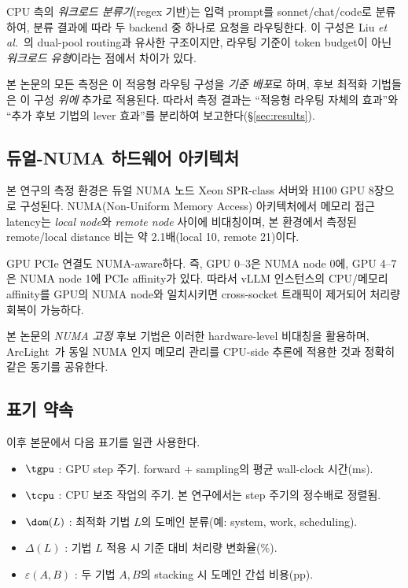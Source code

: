CPU 측의 \emph{워크로드 분류기}(regex 기반)는 입력 prompt를 sonnet/chat/code로 분류하여, 분류 결과에 따라 두 backend 중 하나로 요청을 라우팅한다.
이 구성은 Liu \emph{et al.}~\cite{liu2026dualpool}의 dual-pool routing과 유사한 구조이지만, 라우팅 기준이 token budget이 아닌 \emph{워크로드 유형}이라는 점에서 차이가 있다.

본 논문의 모든 측정은 이 적응형 라우팅 구성을 \emph{기준 배포}로 하며, 후보 최적화 기법들은 이 구성 \emph{위에} 추가로 적용된다.
따라서 측정 결과는 ``적응형 라우팅 자체의 효과''와 ``추가 후보 기법의 lever 효과''를 분리하여 보고한다(\S\ref{sec:results}).

\subsection{듀얼-NUMA 하드웨어 아키텍처}
\label{subsec:numa}

본 연구의 측정 환경은 듀얼 NUMA 노드 Xeon SPR-class 서버와 H100 GPU 8장으로 구성된다.
NUMA(Non-Uniform Memory Access) 아키텍처에서 메모리 접근 latency는 \emph{local node}와 \emph{remote node} 사이에 비대칭이며, 본 환경에서 측정된 remote/local distance 비는 약 2.1배(local 10, remote 21)이다.

GPU PCIe 연결도 NUMA-aware하다.
즉, GPU 0--3은 NUMA node 0에, GPU 4--7은 NUMA node 1에 PCIe affinity가 있다.
따라서 vLLM 인스턴스의 CPU/메모리 affinity를 GPU의 NUMA node와 일치시키면 cross-socket 트래픽이 제거되어 처리량 회복이 가능하다.

본 논문의 \emph{NUMA 고정} 후보 기법은 이러한 hardware-level 비대칭을 활용하며, ArcLight~\cite{xu2026arclight}가 동일 NUMA 인지 메모리 관리를 CPU-side 추론에 적용한 것과 정확히 같은 동기를 공유한다.

\subsection{표기 약속}

이후 본문에서 다음 표기를 일관 사용한다.

\begin{itemize}
  \item $\tgpu$ : GPU step 주기. forward + sampling의 평균 wall-clock 시간(ms).
  \item $\tcpu$ : CPU 보조 작업의 주기. 본 연구에서는 step 주기의 정수배로 정렬됨.
  \item $\dom(L)$ : 최적화 기법 $L$의 도메인 분류(예: system, work, scheduling).
  \item $\Delta(L)$ : 기법 $L$ 적용 시 기준 대비 처리량 변화율(\%).
  \item $\varepsilon(A, B)$ : 두 기법 $A, B$의 stacking 시 도메인 간섭 비용(pp).
\end{itemize}

